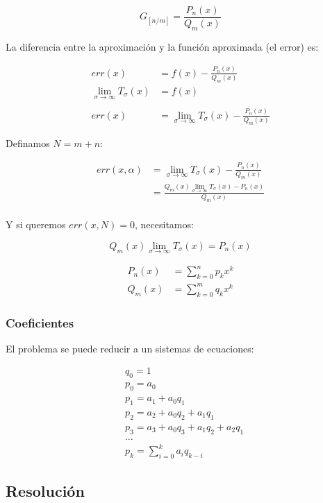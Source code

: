 $$
G_{[n/m]} = \frac{P_n(x)}{Q_m(x)}
$$

\newpage 

La diferencia entre la aproximación y la función aproximada (el error) es:


\begin{align*}
	err(x) &= f(x) - \frac{P_n(x)}{Q_m(x)}  \\
	\lim_{\sigma \to \infty} T_{\sigma}(x) &= f(x) \\
	\\
	err(x) 
	&= \lim_{\sigma \to \infty} T_{\sigma}(x) - \frac{P_n(x)}{Q_m(x)}   	
\end{align*}

Definamos $N = m + n $:

\begin{align*}
	err(x, \alpha) 
	&= \lim_{\sigma \to \infty} T_{\sigma}(x) - \frac{P_n(x)}{Q_m(x)}	\\
	&= \frac{ Q_m(x) \displaystyle{\lim_{\sigma \to \infty} T_{\sigma}(x)} - P_n(x)}{Q_m(x)} \\
\end{align*}


Y si queremos $err(x, N) = 0$, necesitamos:

$$ Q_m(x)\lim_{\sigma \to \infty} T_{\sigma}(x) = P_n(x) $$

\begin{align*}
	P_n(x) 
	&= \sum_{k = 0}^{n} p_k x^k \\
	Q_m(x) 
	&= \sum_{k = 0}^{m} q_k x^k 
\end{align*}



\subsubsection{Coeficientes}

El problema se puede reducir a un sistemas de ecuaciones:

\begin{align*}
	&q_0 = 1 \\
	&p_0 = a_0 \\
	&p_1 = a_1 + a_0 q_1 \\
	&p_2 = a_2 + a_0 q_2 + a_1 q_1 \\
	&p_3 = a_3 + a_0 q_3 + a_1 q_2 + a_2 q_1\\
	&\dots   \\
	&p_k = \sum_{i=0}^{k} a_i q_{k-i}
\end{align*}


\subsection{Resolución}

